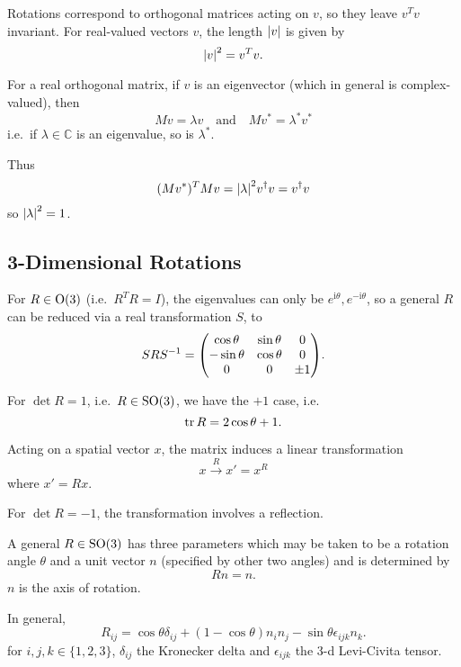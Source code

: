 \documentclass[a4paper,11pt]{article}
\begin{document}
	Rotations correspond to orthogonal matrices acting on $v$, so they leave $v^T v$ invariant. For real-valued vectors $v$, the length $\abs{v}$ is given by
	\[
		\abs{v}^2 = v^T v.
	\]
	
	For a real orthogonal matrix, if $v$ is an eigenvector (which in general is complex-valued), then
	\[
		M v = \lambda v \quad \text{and} \quad M v^* = \lambda^* v^*
	\]
	i.e.\ if $\lambda \in \mathbb{C}$ is an eigenvalue, so is $\lambda^*$.

	Thus
	\[
		(Mv^*)^T Mv = \abs{\lambda}^2 v^\dagger v = v^\dagger v
	\]
	so $\abs{\lambda}^2 = 1$.

	\subsection{3-Dimensional Rotations}
	\begin{lem}
		For $R \in \operatorname{O}(3)$ (i.e.\ $R^T R = I$), the eigenvalues can only be $e ^{\mathrm{i} \theta}, e ^{-\mathrm{i} \theta}$, so a general $R$ can be reduced via a real transformation $S$, to
		\[
			S R S^{-1} = \mqty(\cos \theta & \sin \theta & 0\\ -\sin \theta & \cos \theta & 0\\ 0 & 0 & \pm 1).
		\]
	\end{lem}

	For $\det R = 1$, i.e.\ $R \in \operatorname{SO}(3)$, we have the $+1$ case, i.e.
	\[
		\tr R = 2 \cos \theta + 1.
	\]
	
	Acting on a spatial vector $x$, the matrix induces a linear transformation
	\[
		x \xrightarrow{R} x' = x^R
	\]
	where $x' = R x$.

	For $\det R = -1$, the transformation involves a reflection.

	\begin{lem}
		A general $R \in \operatorname{SO}(3)$ has three parameters which may be taken to be a rotation angle $\theta$ and a unit vector $n$ (specified by other two angles) and is determined by 
		\[
			R n = n.
		\]
		$n$ is the axis of rotation.
	\end{lem}

	\begin{prop}
		In general,
		\begin{equation}
			R _{ij} = \cos \theta \delta _{ij} + (1- \cos \theta)n_i n_j - \sin \theta \epsilon _{ijk} n_k.
			\label{eq:3.1.1}
		\end{equation}
		for $i,j,k \in \{1,2,3\}$, $\delta _{ij}$ the Kronecker delta and $\epsilon _{ijk}$ the 3-d Levi-Civita tensor.
	\end{prop}
\end{document}
